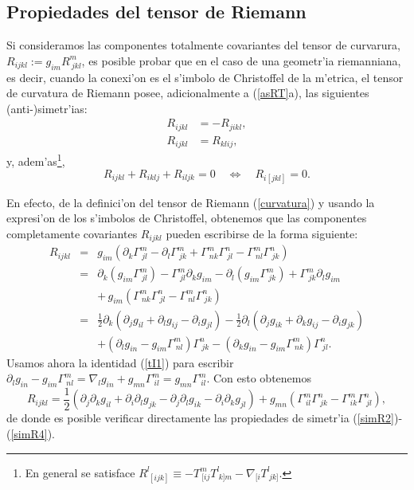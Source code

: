 \subsection{Propiedades del tensor de Riemann}
Si consideramos las componentes totalmente covariantes del tensor de curvarura, $R_{ijkl}:=g_{im}R^m_{\ jkl}$, es posible probar que en el caso de una geometr'ia riemanniana, es decir, cuando la conexi'on es el s'imbolo de Christoffel de la m'etrica, el tensor de curvatura de Riemann posee, adicionalmente a (\ref{asRT}a), las siguientes (anti-)simetr'ias:
\begin{align}
R_{ijkl} & =-R_{jikl},\label{simR2}\\
R_{ijkl} & =R_{klij}, \label{simR3}
\end{align}
y, adem'as\footnote{En general se satisface $R^l_{\ [ijk]}\equiv -T^m_{\ [ij}T^l_{\ k]m}-\nabla_{[i}T^l_{\ jk]}$.},
\begin{equation}
R_{ijkl}+R_{iklj}+R_{iljk}=0\quad\Leftrightarrow\quad
R_{i[jkl]}=0. \label{simR4}
\end{equation}

En efecto, de la definici'on del tensor de Riemann (\ref{curvatura}) y usando la expresi'on de los s'imbolos de Christoffel, obtenemos que las componentes completamente covariantes $R_{ijkl}$ pueden escribirse de la forma siguiente:
\begin{eqnarray}
 R_{ijkl}&=&g_{im}\left(\partial_k\Gamma^m_{\ jl}-\partial_l\Gamma^m_{\ jk}+\Gamma^m_{\ nk}\Gamma^n_{\ jl}-\Gamma^m_{\ nl}\Gamma^n_{\ jk}\right) \\
&=&\partial_k\left(g_{im}\Gamma^m_{\ jl}\right)-\Gamma^m_{\ jl}\partial_k g_{im}-\partial_l\left(g_{im}\Gamma^m_{\ jk}\right)+\Gamma^m_{\ jk}\partial_l g_{im} \nonumber\\
&&+\,g_{im}\left(\Gamma^m_{\ nk}\Gamma^n_{\ jl}-\Gamma^m_{\ nl}\Gamma^n_{\ jk}\right) \\
&=&\frac{1}{2}\partial_k\left(\partial_jg_{il}+\partial_lg_{ij}-\partial_ig_{jl}\right)-\frac{1}{2}\partial_l\left(\partial_jg_{ik}+\partial_kg_{ij}-\partial_ig_{jk}\right)\nonumber\\
&&+\left(\partial_lg_{in}-g_{im}\Gamma^m_{\ nl}\right)\Gamma^n_{\ jk}-\left(\partial_kg_{in}-g_{im}\Gamma^m_{\ nk}\right)\Gamma^n_{\ jl}.
\end{eqnarray}
Usamos ahora la identidad (\ref{tI1}) para escribir $\partial_lg_{in}-g_{im}\Gamma^m_{\ nl}=\nabla_lg_{in}+g_{mn}\Gamma^m_{\ il}= g_{mn}\Gamma^m_{\ il}$. Con esto obtenemos
\begin{equation}
 R_{ijkl}=\frac{1}{2}\left(\partial_j\partial_kg_{il}+\partial_i\partial_lg_{jk}-\partial_j\partial_lg_{ik}-\partial_i\partial_kg_{jl}\right) + g_{mn}\left(\Gamma^m_{\ il}\Gamma^n_{\ jk}-\Gamma^m_{\ ik}\Gamma^n_{\ jl}\right), \label{Rdddd}
\end{equation}
de donde es posible verificar directamente las propiedades de simetr'ia (\ref{simR2})-(\ref{simR4}).

